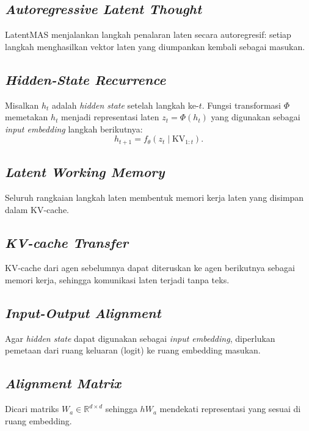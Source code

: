 \subsection{\textit{Autoregressive Latent Thought}}
LatentMAS menjalankan langkah penalaran laten secara autoregresif: setiap langkah menghasilkan vektor laten yang diumpankan kembali sebagai masukan.

\subsection{\textit{Hidden-State Recurrence}}
Misalkan \(h_t\) adalah \textit{hidden state} setelah langkah ke-\(t\). Fungsi transformasi \(\Phi\) memetakan \(h_t\) menjadi representasi laten \(z_t = \Phi(h_t)\) yang digunakan sebagai \textit{input embedding} langkah berikutnya:
\begin{equation}
h_{t+1} = f_\theta(z_t \mid \mathrm{KV}_{1:t}).
\end{equation}

\subsection{\textit{Latent Working Memory}}
Seluruh rangkaian langkah laten membentuk memori kerja laten yang disimpan dalam KV-cache.

\subsection{\textit{KV-cache Transfer}}
KV-cache dari agen sebelumnya dapat diteruskan ke agen berikutnya sebagai memori kerja, sehingga komunikasi laten terjadi tanpa teks.

\subsection{\textit{Input-Output Alignment}}
Agar \textit{hidden state} dapat digunakan sebagai \textit{input embedding}, diperlukan pemetaan dari ruang keluaran (logit) ke ruang embedding masukan.

\subsection{\textit{Alignment Matrix}}
Dicari matriks \(W_a \in \mathbb{R}^{d \times d}\) sehingga \(h W_a\) mendekati representasi yang sesuai di ruang embedding.

